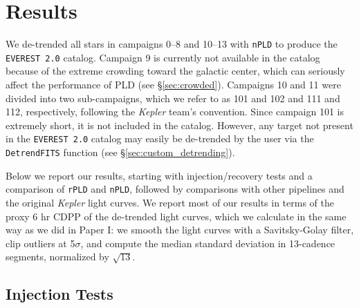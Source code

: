 \documentclass[]{aastex62}
\newcommand{\edited}[1]{{\color{red} #1}}
\begin{document}
\section{Results}
\label{sec:results}
\edited{We de-trended all stars in campaigns 0--8 and 10--13 with \texttt{nPLD} to produce the
\texttt{EVEREST 2.0} catalog. Campaign 9 is currently not available in the catalog
because of the extreme crowding toward the galactic center, which can seriously affect
the performance of PLD (see \S\ref{sec:crowded}). Campaigns 10 and 11 were divided into
two sub-campaigns, which we refer to as 101 and 102 and 111 and 112, respectively, following
the \emph{Kepler} team's convention. Since campaign 101 is extremely short, it is
not included in the catalog. However, any target not present in the \texttt{EVEREST 2.0}
catalog may easily be de-trended by the user via the \texttt{DetrendFITS} function
(see \S\ref{sec:custom_detrending}).}

Below we report our results, starting with
injection/recovery tests and a comparison of \texttt{rPLD} and \texttt{nPLD},
followed by comparisons with other pipelines and the original \emph{Kepler}
light curves. We report most of our results in terms of the proxy 6 hr CDPP of
the de-trended light curves, which we calculate in the same way as we did
in Paper I: we smooth the light curves with a Savitsky-Golay filter, clip
outliers at 5$\sigma$, and compute the median standard deviation in 13-cadence
segments, normalized by $\sqrt{13}$.

\subsection{Injection Tests}
\label{sec:inj}
\end{document}
